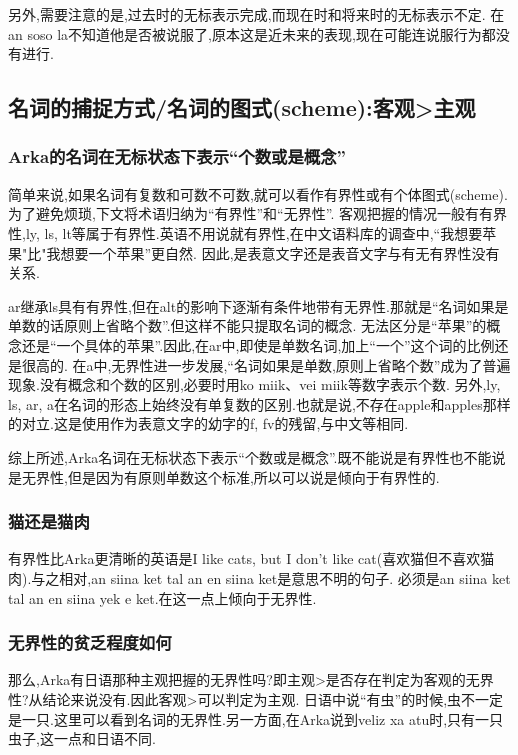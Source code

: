 另外,需要注意的是,过去时的无标表示完成,而现在时和将来时的无标表示不定.
在an soso la不知道他是否被说服了,原本这是近未来的表现,现在可能连说服行为都没有进行.

\subsection{名词的捕捉方式/名词的图式(scheme):客观>主观}

\subsubsection{Arka的名词在无标状态下表示“个数或是概念”}

简单来说,如果名词有复数和可数不可数,就可以看作有界性或有个体图式(scheme).为了避免烦琐,下文将术语归纳为“有界性”和“无界性”.
客观把握的情况一般有有界性,ly, ls, lt等属于有界性.英语不用说就有界性,在中文语料库的调查中,``我想要苹果"比"我想要一个苹果''更自然.
因此,是表意文字还是表音文字与有无有界性没有关系.

ar继承ls具有有界性,但在alt的影响下逐渐有条件地带有无界性.那就是“名词如果是单数的话原则上省略个数”.但这样不能只提取名词的概念.
无法区分是“苹果”的概念还是“一个具体的苹果”.因此,在ar中,即使是单数名词,加上“一个”这个词的比例还是很高的.
在a中,无界性进一步发展,“名词如果是单数,原则上省略个数”成为了普遍现象.没有概念和个数的区别,必要时用ko miik、vei miik等数字表示个数.
另外,ly, ls, ar, a在名词的形态上始终没有单复数的区别.也就是说,不存在apple和apples那样的对立.这是使用作为表意文字的幼字的f, fv的残留,与中文等相同.

综上所述,Arka名词在无标状态下表示“个数或是概念”.既不能说是有界性也不能说是无界性,但是因为有原则单数这个标准,所以可以说是倾向于有界性的.
\subsubsection{猫还是猫肉}

有界性比Arka更清晰的英语是I like cats, but I don't like cat(喜欢猫但不喜欢猫肉).与之相对,an siina ket tal an en siina ket是意思不明的句子.
必须是an siina ket tal an en siina yek e ket.在这一点上倾向于无界性.

\subsubsection{无界性的贫乏程度如何}

那么,Arka有日语那种主观把握的无界性吗?即主观>是否存在判定为客观的无界性?从结论来说没有.因此客观>可以判定为主观.
日语中说“有虫”的时候,虫不一定是一只.这里可以看到名词的无界性.另一方面,在Arka说到veliz xa atu时,只有一只虫子,这一点和日语不同.

